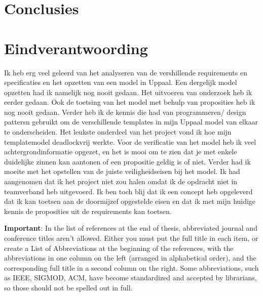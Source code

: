  
\label{chapter:Conclusions}
\thispagestyle{myheadings}

\graphicspath{{4_Conclusion/Figures/}}


\section{Conclusies}


\newpage
\section{Eindverantwoording}

Ik heb erg veel geleerd van het analyseren van de vershillende requirements en specificaties en het opzetten van een model in Uppaal. Een dergelijk model opzetten had ik namelijk nog nooit gedaan. Het uitvoeren van onderzoek heb ik eerder gedaan. Ook de toetsing van het model met behulp van proposities heb ik nog nooit gedaan. Verder heb ik de kennis die had van programmeren/ design pattersn gebruikt om de verschillende templates in mijn Uppaal model van elkaar te onderscheiden. Het leukste onderdeel van het project vond ik hoe mijn templatemodel deadlockvrij werkte. Voor de verificatie van het model heb ik veel achtergrondinformatie opgezet, en het is mooi om te zien dat je met enkele duidelijke zinnen kan aantonen of een propositie geldig is of niet.  Verder had ik moeite met het opstellen van de juiste veiligheidseisen bij het model. Ik had aangenomen dat ik het project niet zou halen omdat ik de opdracht niet in teamverband heb uitgevoerd. Ik ben toch blij dat ik een concept heb opgeleverd dat ik kan toetsen aan de doormijzef opgestelde eisen en dat ik met mijn huidige kennis de proposities uit de requirements kan toetsen.



{\bf Important}: In the list of references at the end of thesis, abbreviated journal and conference titles aren't allowed. Either you must put the full title in each item, or create a List of Abbreviations at the beginning of the references, with the abbreviations in one column on the left (arranged in alphabetical order), and the corresponding full title in a second column on the right.  Some abbreviations, such as IEEE, SIGMOD, ACM, have become standardized and accepted by librarians, so those should not be spelled out in full.



